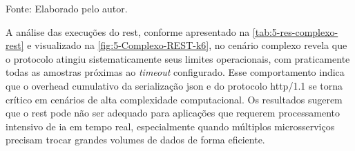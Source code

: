 \begin{table}[H]
\centering
\caption{\gls{rest} comparado com os demais protocolos — Cenário Complexo (\acrshort{grpc}/Thrift em $\Delta$\% vs \gls{rest})}
\label{tab:5-res-complexo-rest}
{\par \raggedright \footnotesize Fonte: Elaborado pelo autor.\par}
\end{table}

A análise das execuções do \gls{rest}, conforme apresentado na \autoref{tab:5-res-complexo-rest} e visualizado na \autoref{fig:5-Complexo-REST-k6}, no cenário complexo revela que o protocolo atingiu sistematicamente seus limites operacionais, com praticamente todas as amostras próximas ao \textit{timeout} configurado. Esse comportamento indica que o overhead cumulativo da serialização \acrshort{json} e do protocolo \acrshort{http}/1.1 se torna crítico em cenários de alta complexidade computacional. Os resultados sugerem que o \gls{rest} pode não ser adequado para aplicações que requerem processamento intensivo de \gls{ia} em tempo real, especialmente quando múltiplos microsserviços precisam trocar grandes volumes de dados de forma eficiente.

